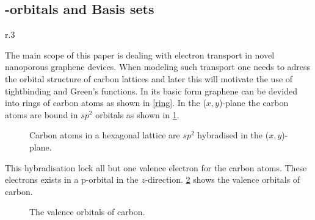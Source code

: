 \subsection{\mathinhead{\pi}{\pi}-orbitals and Basis sets}
\begin{wrapfigure}[7]{r}{.3\textwidth}
	\vspace{-2.3em}
	\centering
	\caption{Graphene lattices consists of hexagonal arrangements of carbon atoms.}\label{ring}
\end{wrapfigure}
The main scope of this paper is dealing with electron transport in novel nanoporous graphene devices.
When modeling such transport one needs to adress the orbital structure of carbon lattices and later this will motivate the use of tightbinding and Green's functions.
In its basic form graphene can be devided into rings of carbon atoms as shown in \cref{ring}. In the (\(x,y\))-plane the carbon atoms are bound in \(sp^2\) orbitals as shown in \cref{sp2}.
\begin{figure}[H]
  \centering
		\caption{Carbon atoms in a hexagonal lattice are \(sp^2\) hybradised in the (\(x,y\))-plane.}\label{sp2}
\end{figure}
This hybradisation lock all but one valence electron for the carbon atoms. These electrons exists in a p-orbital in the \(z\)-direction.
\cref{p} shows the valence orbitals of carbon.
\begin{figure}[H]
	\begin{center}
		\caption{The valence orbitals of carbon.}
		\label{p}
	\end{center}
\end{figure}
